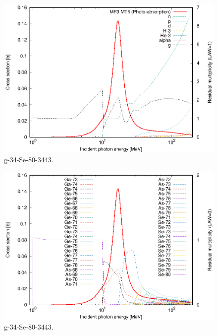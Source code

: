 \begin{figure}
 \includegraphics[width=\linewidth]{eps/g_34-Se-80_3443.eps}
  \caption{g-34-Se-80-3443.}
\end{figure}
\begin{figure}
 \includegraphics[width=\linewidth]{eps-law0/g_34-Se-80_3443.eps}
 \caption{g-34-Se-80-3443.}
\end{figure}
\newpage \clearpage

